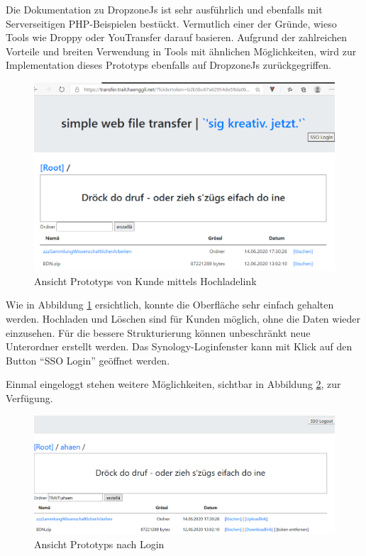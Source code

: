 \clearpage
Die Dokumentation \cite{DropzoneJs} zu DropzoneJs ist sehr ausführlich und ebenfalls mit Serverseitigen PHP-Beispielen bestückt. 
Vermutlich einer der Gründe, wieso Tools wie Droppy oder YouTransfer darauf basieren.
Aufgrund der zahlreichen Vorteile und breiten Verwendung in Tools mit ähnlichen Möglichkeiten,
wird zur Implementation dieses Prototyps ebenfalls auf DropzoneJs zurückgegriffen.

\begin{figure}[!h]
    \centering
    \includegraphics[width=1\linewidth]{content/images/prototyp_nichteingeloggt.png}
    \caption{Ansicht Prototyps von Kunde mittels Hochladelink}
    \label{fig:Prototyp_Hochladelink}
\end{figure} %
Wie in Abbildung \ref{fig:Prototyp_Hochladelink} ersichtlich, konnte die Oberfläche sehr einfach gehalten werden.
Hochladen und Löschen sind für Kunden möglich, ohne die Daten wieder einzusehen. Für die bessere Strukturierung können unbeschränkt neue Unterordner erstellt werden.
Das Synology-Loginfenster kann mit Klick auf den Button ``SSO Login'' geöffnet werden. \\ 
    
\clearpage  

Einmal eingeloggt stehen weitere Möglichkeiten, sichtbar in Abbildung \ref{fig:Prototyp_Migrator}, zur Verfügung. 

\begin{figure}[!h]
    \centering
    \includegraphics[width=1\linewidth]{content/images/prototyp_eingeloggt.png}
    \caption{Ansicht Prototyps nach Login}
    \label{fig:Prototyp_Migrator}
\end{figure}

